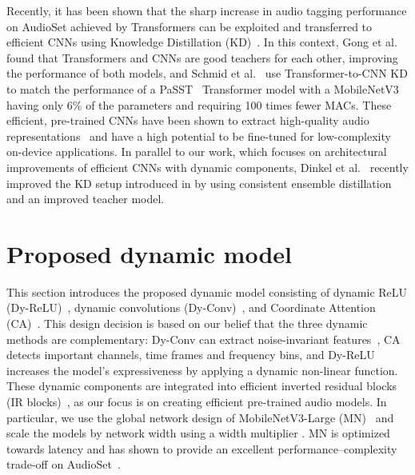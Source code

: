 \documentclass[lettersize,journal]{IEEEtran}
\begin{document}
Recently, it has been shown that the sharp increase in audio tagging performance on AudioSet achieved by Transformers can be exploited and transferred to efficient CNNs using Knowledge Distillation (KD)~\cite{Hinton2015distilling, Ba14KD}. In this context, Gong et al.~\cite{Gong22CMKD} found that Transformers and CNNs are good teachers for each other, improving the performance of both models, and Schmid et al.~\cite{Schmid22Efficient} use Transformer-to-CNN KD to match the performance of a PaSST~\cite{Koutini21Passt} Transformer model with a MobileNetV3 having only 6\% of the parameters and requiring 100 times fewer MACs. These efficient, pre-trained CNNs have been shown to extract high-quality audio representations~\cite{schmid2023low} and have a high potential to be fine-tuned for low-complexity on-device applications. In parallel to our work, which focuses on architectural improvements of efficient CNNs with dynamic components, Dinkel et al.~\cite{dinkel2023ced} recently improved the KD setup introduced in \cite{Schmid22Efficient} by using consistent ensemble distillation and an improved teacher model.












\section{Proposed dynamic model}
\label{sec:dynamic}

This section introduces the proposed dynamic model consisting of dynamic ReLU (Dy-ReLU)~\cite{chen2020dynamic_relu}, dynamic convolutions (Dy-Conv)~\cite{chen2020dynamic_conv}, and Coordinate Attention (CA)~\cite{hou2021coordinate}. This design decision is based on our belief that the three dynamic methods are complementary: Dy-Conv can extract noise-invariant features~\cite{zhang2020dynet}, CA detects important channels, time frames and frequency bins, and Dy-ReLU increases the model's expressiveness by applying a dynamic non-linear function. These dynamic components are integrated into efficient inverted residual blocks (IR blocks)~\cite{Sandler18MobileNetsV2}, as our focus is on creating efficient pre-trained audio models. In particular, we use the global network design of MobileNetV3-Large (MN)~\cite{Howard19MobileNetV3} and scale the models by network width using a width multiplier . MN is optimized towards latency and has shown to provide an excellent performance--complexity trade-off on AudioSet~\cite{Schmid22Efficient}.
\end{document}

